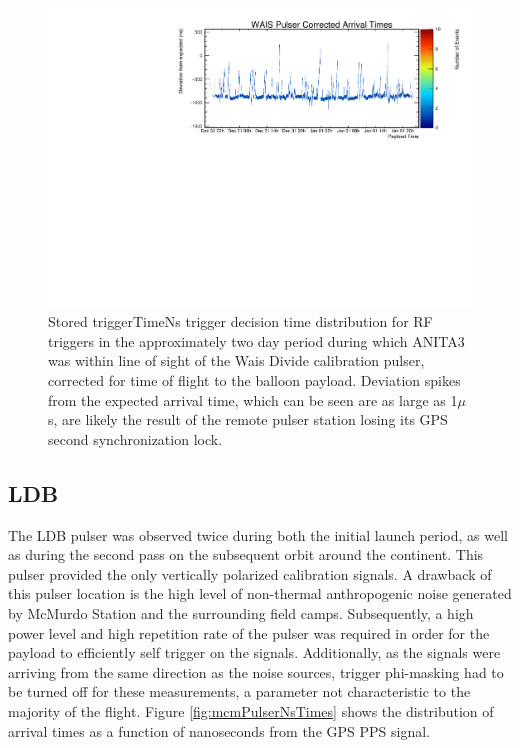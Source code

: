 	\begin{figure}
		\includegraphics[width=\textwidth]{figures/waisPulserCorrNs}
		\caption{Stored triggerTimeNs trigger decision time distribution for RF triggers in the approximately two day period during which ANITA3 was within line of sight of the Wais Divide calibration pulser, corrected for time of flight to the balloon payload.  Deviation spikes from the expected arrival time, which can be seen are as large as 1$\mu$s, are likely the result of the remote pulser station losing its GPS second synchronization lock.}
		\label{fig:waisTrigTimeCorr}
	\end{figure}		
		
		

	\subsection{LDB}
		The LDB pulser was observed twice during both the initial launch period, as well as during the second pass on the subsequent orbit around the continent.  This pulser provided the only vertically polarized calibration signals.  A drawback of this pulser location is the high level of non-thermal anthropogenic noise generated by McMurdo Station and the surrounding field camps.  Subsequently, a high power level and high repetition rate of the pulser was required in order for the payload to efficiently self trigger on the signals.  Additionally, as the signals were arriving from the same direction as the noise sources, trigger phi-masking had to be turned off for these measurements, a parameter not characteristic to the majority of the flight.  Figure \ref{fig:mcmPulserNsTimes} shows the distribution of arrival times as a function of nanoseconds from the GPS PPS signal.
	
